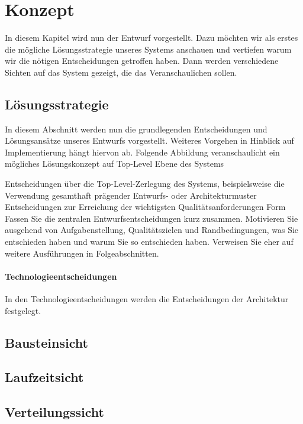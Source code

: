 \chapter{Konzept}
\label{ch:Konzept}
In diesem Kapitel wird nun der Entwurf vorgestellt. Dazu möchten wir als erstes die mögliche Lösungsstrategie unseres Systems anschauen und vertiefen warum wir die nötigen Entscheidungen getroffen haben. Dann werden verschiedene Sichten auf das System gezeigt, die das Veranschaulichen sollen.
\section{Lösungsstrategie}
In diesem Abschnitt werden nun die grundlegenden Entscheidungen und Lösungsansätze unseres Entwurfs vorgestellt. Weiteres Vorgehen in Hinblick auf Implementierung hängt hiervon ab.
Folgende Abbildung veranschaulicht ein mögliches Lösungskonzept auf Top-Level Ebene des Systems

Entscheidungen über die Top-Level-Zerlegung des Systems, beispielsweise die Verwendung gesamthaft prägender Entwurfs- oder Architekturmuster
Entscheidungen zur Erreichung der wichtigsten Qualitätsanforderungen
Form
Fassen Sie die zentralen Entwurfsentscheidungen kurz zusammen. Motivieren Sie ausgehend von Aufgabenstellung, Qualitätszielen und Randbedingungen, was Sie entschieden haben und warum Sie so entschieden haben. Verweisen Sie eher auf weitere Ausführungen in Folgeabschnitten.
\subsubsection{Technologieentscheidungen}
In den Technologieentscheidungen werden die Entscheidungen der Architektur festgelegt.  



\section{Bausteinsicht}
\section{Laufzeitsicht}
\section{Verteilungssicht}